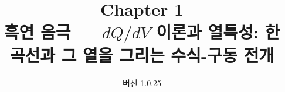 
\renewcommand{\theequation}{1.\arabic{equation}}
\renewcommand{\thesection}{1.\arabic{section}}

\title{\textbf{\LARGE Chapter 1}\\[0.35em]\Large 흑연 음극 --- $dQ/dV$ 이론과 열특성: 한 곡선과 그 열을 그리는 수식-구동 전개}
\author{}
\date{\normalsize 버전 1.0.25}


\maketitle


































